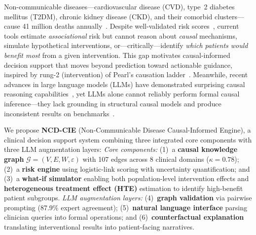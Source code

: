 \documentclass[runningheads]{llncs}
\begin{document}
Non-communicable diseases---cardiovascular disease (CVD), type~2
diabetes mellitus (T2DM), chronic kidney disease (CKD), and their
comorbid clusters---cause 41 million deaths
annually~\cite{who2021ncd}.
Despite well-validated risk scores~\cite{dagostino2008,hippisley2017qrisk3,score22021},
current tools estimate \emph{associational} risk but cannot reason about
\emph{causal} mechanisms, simulate hypothetical interventions, or---critically---identify
\emph{which patients would benefit most} from a given intervention.
This gap motivates causal-informed decision support that moves beyond
prediction toward actionable guidance, inspired by rung-2 (intervention)
of Pearl's causation ladder~\cite{pearl2018book}.
Meanwhile, recent advances in large language models (LLMs) have
demonstrated surprising causal reasoning
capabilities~\cite{ma2024causal,kiciman2023causal}, yet LLMs alone
cannot reliably perform formal causal inference---they lack grounding
in structural causal models and produce inconsistent results on
benchmarks~\cite{jin2023cladder}.

We propose \textbf{NCD-CIE} (Non-Communicable Disease Causal-Informed
Engine), a clinical decision support system combining three integrated
core components with three LLM augmentation layers:
\noindent\emph{Core components:}
(1)~a \textbf{causal knowledge graph} $\mathcal{G}=(V,E,W,\varepsilon)$
  with 107 edges across 8 clinical domains ($\kappa=0.78$);
(2)~a \textbf{risk engine} using logistic-link scoring with
  uncertainty quantification; and
(3)~a \textbf{what-if simulator} enabling both population-level
  intervention effects and \textbf{heterogeneous treatment effect (HTE)}
  estimation to identify high-benefit patient subgroups.
\emph{LLM augmentation layers:}
(4)~\textbf{graph validation} via pairwise prompting (87.9\% expert
  agreement);
(5)~\textbf{natural language interface} parsing clinician queries
  into formal operations; and
(6)~\textbf{counterfactual explanation} translating interventional
  results into patient-facing narratives.
\end{document}
